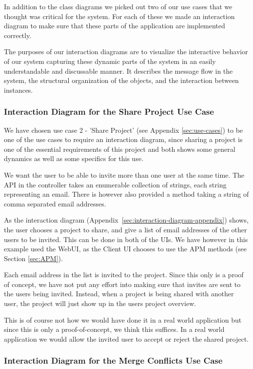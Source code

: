 In addition to the class diagrams we picked out two of our use cases that we thought was  critical for the system. For each of these we made an interaction diagram to make sure that these parts of the application are implemented correctly. 

The purposes of our interaction diagrams are to visualize the interactive behavior of our system capturing these dynamic parts of 
the system in an easily understandable and discussable manner. It describes the message flow in the system, the structural organization
of the objects, and the interaction between instances.

\subsubsection{Interaction Diagram for the Share Project Use Case}

We have chosen use case 2 - 'Share Project' (see Appendix \ref{sec:use-cases}) to be one of the use cases to require an interaction diagram, since sharing a project is one of the essential
requirements of this project and both shows some general dynamics as well as some specifics for this use.

We want the user to be able to invite more than one user at the same time. The API in the controller takes an enumerable collection of strings, each string
representing an email. There is however also provided a method taking a string of comma separated email addresses.

As the interaction diagram (Appendix~\ref{sec:interaction-diagram-appendix}) shows, the user chooses a project to share, and give a list of email
addresses of the other users to be invited. This can be done in both of the UIs. We have however in this example used the WebUI, as the Client UI
chooses to use the APM methods (see Section \ref{sec:APM}). 

Each email address in the list is invited to the project. Since this only is a proof of concept, we have not put any effort into making sure that invites 
are sent to the users being invited. Instead, when a project is being shared with another user, the project will just show up in the users project overview.

This is of course not how we would have done it in a real world application but since this is only a proof-of-concept, we think this suffices. In a 
real world application we would allow the invited user to accept or reject the shared project.

\subsubsection{Interaction Diagram for the Merge Conflicts Use Case}

